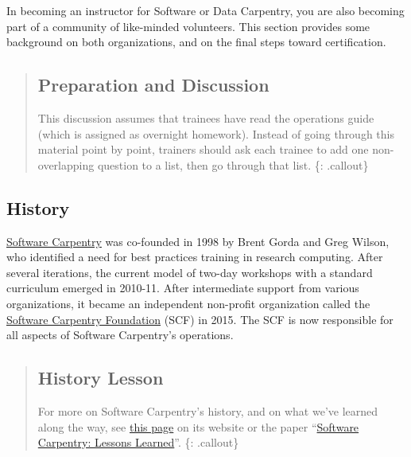 
In becoming an instructor for Software or Data Carpentry, you are also
becoming part of a community of like-minded volunteers. This section
provides some background on both organizations, and on the final steps
toward certification.

\begin{quote}
\subsection{Preparation and Discussion}\label{preparation-and-discussion}

This discussion assumes that trainees have read the operations
guide (which is assigned as overnight homework). Instead of going through this material point by
point, trainers should ask each trainee to add one non-overlapping
question to a list, then go through that list. \{: .callout\}
\end{quote}

\subsection{History}\label{history}

\href{http://software-carpentry.org}{Software Carpentry} was co-founded
in 1998 by Brent Gorda and Greg Wilson, who identified a need for best
practices training in research computing. After several iterations, the
current model of two-day workshops with a standard curriculum emerged in
2010-11. After intermediate support from various organizations, it
became an independent non-profit organization called the
\href{http://software-carpentry.org/scf/}{Software Carpentry Foundation}
(SCF) in 2015. The SCF is now responsible for all aspects of Software
Carpentry's operations.

\begin{quote}
\subsection{History Lesson}\label{history-lesson}

For more on Software Carpentry's history, and on what we've learned
along the way, see
\href{http://software-carpentry.org/scf/history/}{this page} on its
website or the paper
``\href{http://f1000research.com/articles/3-62/v2}{Software Carpentry:
Lessons Learned}''. \{: .callout\}
\end{quote}

